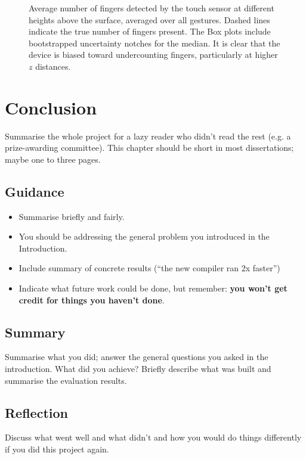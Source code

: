 \documentclass{l4proj}
\begin{document}
{\begin{figure}[htb]
    \caption{Average number of fingers detected by the touch sensor at different heights above the surface, averaged over all gestures. Dashed lines indicate
    the true number of fingers present. The Box plots include bootstrapped uncertainty notches for the median. It is clear that the device is biased toward 
    undercounting fingers, particularly at higher $z$ distances.
    }

    \label{fig:boxplot} 
\end{figure}


\chapter{Conclusion}    
Summarise the whole project for a lazy reader who didn't read the rest (e.g. a prize-awarding committee). This chapter should be short in most dissertations; maybe one to three pages.
\section{Guidance}
\begin{itemize}
    \item
        Summarise briefly and fairly.
    \item
        You should be addressing the general problem you introduced in the
        Introduction.        
    \item
        Include summary of concrete results (``the new compiler ran 2x
        faster'')
    \item
        Indicate what future work could be done, but remember: \textbf{you
        won't get credit for things you haven't done}.
\end{itemize}

\section{Summary}
Summarise what you did; answer the general questions you asked in the introduction. What did you achieve? Briefly describe what was built and summarise the evaluation results.

\section{Reflection}
Discuss what went well and what didn't and how you would do things differently if you did this project again.

}
\end{document}

